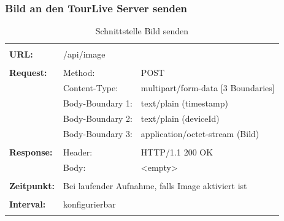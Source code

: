 \subsubsection{Bild an den TourLive Server senden}
\begin{longtable}{ p{2.5cm} || p{3.5cm} p{5.5cm}}
&  \\ [-1.5ex]
	\textbf{URL:} & \multicolumn{2}{p{9cm}}{/api/image} \\ [1ex] \hline & &  \\ [-1.5ex]
	\textbf{Request:} & Method: & POST \\
		& Content-Type: & multipart/form-data [3 Boundaries] \\
		& Body-Boundary 1: & text/plain (timestamp) \\
		& Body-Boundary 2: & text/plain (deviceId) \\
		& Body-Boundary 3: & application/octet-stream (Bild)  \\ [1ex] \hline & &  \\ [-1.5ex]
	\textbf{Response:} & Header: & HTTP/1.1 200 OK \\
		& Body: & <empty>  \\ [1ex] \hline & &  \\ [-1.5ex]
	\textbf{Zeitpunkt:} & \multicolumn{2}{p{9cm}}{Bei laufender Aufnahme, falls Image aktiviert ist}  \\ [1ex] \hline & &  \\ [-1.5ex]
	\textbf{Interval:} & \multicolumn{2}{p{9cm}}{konfigurierbar} \\ [1ex]  
	\caption{Schnittstelle Bild senden}
\end{longtable}

